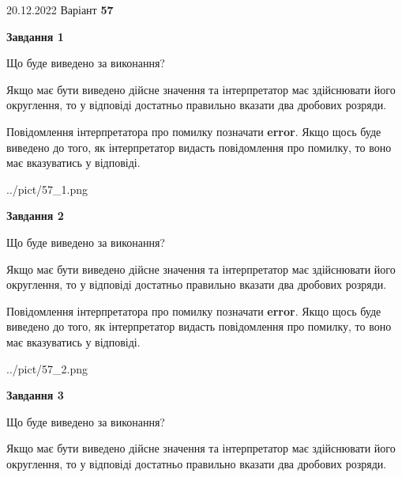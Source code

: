 \documentclass[12pt, ukrainian]{article}
\begin{document}
{20.12.2022 Варіант \No \textbf { 57 }\par}
{
\begin {Large}

{\begin {center}\textbf{Завдання 1}\end {center}}\par
Що буде виведено за виконання? \par

Якщо має бути виведено дійсне значення та інтерпретатор має здійснювати його округлення, 
то у відповіді достатньо правильно вказати два дробових розряди.

Повідомлення інтерпретатора про помилку позначати \textbf{error}.
Якщо щось буде виведено до того, як інтерпретатор видасть повідомлення про помилку, 
то воно має вказуватись у відповіді. \par

\begin{center}
	{../pict/57_1.png}
\end{center}
\newpage

{\begin {center}\textbf{Завдання 2}\end {center}}\par
Що буде виведено за виконання? \par

Якщо має бути виведено дійсне значення та інтерпретатор має здійснювати його округлення, 
то у відповіді достатньо правильно вказати два дробових розряди.

Повідомлення інтерпретатора про помилку позначати \textbf{error}.
Якщо щось буде виведено до того, як інтерпретатор видасть повідомлення про помилку, 
то воно має вказуватись у відповіді. \par

\begin{center}
	{../pict/57_2.png}
\end{center}
\newpage

{\begin {center}\textbf{Завдання 3}\end {center}}\par
Що буде виведено за виконання? \par

Якщо має бути виведено дійсне значення та інтерпретатор має здійснювати його округлення, 
то у відповіді достатньо правильно вказати два дробових розряди.


\end{Large}}
\end{document}
